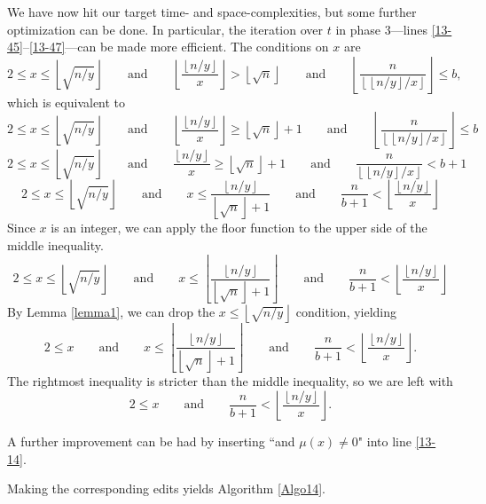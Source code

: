 \documentclass[12pt]{article}
\newcommand{\eqn}[1]{\begin{displaymath} #1 \end{displaymath}}
\newcommand{\floor}[1]{{\left\lfloor #1 \right\rfloor}}
\newcommand{\qquadtext}[1]{\qquad \text{#1} \qquad}
\newcommand{\floordiv}[2]{\floor{\frac{#1}{#2}}}
\newcommand{\isqrt}[1]{\floor{\sqrt{#1}}}
\begin{document}
We have now hit our target time- and space-complexities, but some further optimization can be done.  In particular, the iteration over $t$ in phase 3---lines \ref{13-45}--\ref{13-47}---can be made more efficient.  The conditions on $x$ are
\eqn{2 \leq x \leq \isqrt{n/y} \qquadtext{and} \floordiv{\floor{n/y}}{x} > \isqrt{n} \qquadtext{and} \floordiv{n}{\floor{\floor{n/y}/x}} \leq b,}
which is equivalent to
\eqn{2 \leq x \leq \isqrt{n/y} \qquadtext{and} \floordiv{\floor{n/y}}{x} \geq \isqrt{n}+1 \qquadtext{and} \floordiv{n}{\floor{\floor{n/y}/x}} \leq b}
\eqn{2 \leq x \leq \isqrt{n/y} \qquadtext{and} \frac{\floor{n/y}}{x} \geq \isqrt{n}+1 \qquadtext{and} \frac{n}{\floor{\floor{n/y}/x}} < b+1}
\eqn{2 \leq x \leq \isqrt{n/y} \qquadtext{and} x \leq \frac{\floor{n/y}}{\isqrt{n}+1} \qquadtext{and} \frac{n}{b+1} < \floordiv{\floor{n/y}}{x}}
Since $x$ is an integer, we can apply the floor function to the upper side of the middle inequality.
\eqn{2 \leq x \leq \isqrt{n/y} \qquadtext{and} x \leq \floor{\frac{\floor{n/y}}{\isqrt{n}+1}} \qquadtext{and} \frac{n}{b+1} < \floordiv{\floor{n/y}}{x}}
By Lemma \ref{lemma1}, we can drop the $x \leq \isqrt{n/y}$ condition, yielding
\eqn{2 \leq x \qquadtext{and} x \leq \floor{\frac{\floor{n/y}}{\isqrt{n}+1}} \qquadtext{and} \frac{n}{b+1} < \floordiv{\floor{n/y}}{x}.}
The rightmost inequality is stricter than the middle inequality, so we are left with
\eqn{2 \leq x \qquadtext{and} \frac{n}{b+1} < \floordiv{\floor{n/y}}{x}.}

A further improvement can be had by inserting ``and $\mu(x) \neq 0$" into line \ref{13-14}.

Making the corresponding edits yields Algorithm \ref{Algo14}.
\end{document}
